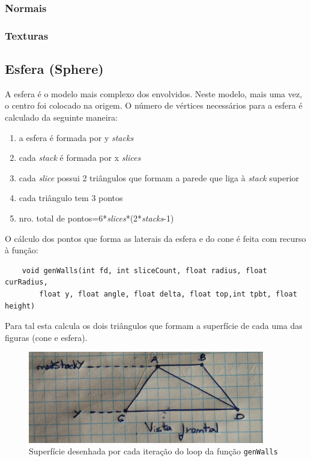 \documentclass{article}
\begin{document}
\subsubsection{Normais}

\subsubsection{Texturas}

\subsection{Esfera (Sphere)}
A esfera é o modelo mais complexo dos envolvidos. Neste modelo, mais uma vez, o centro foi colocado na origem. O número de vértices necessários para a esfera é calculado da seguinte maneira:
\begin{enumerate}
    \item a esfera é formada por y \textit{stacks}
    \item cada \textit{stack} é formada por x \textit{slices}
    \item cada \textit{slice} possui 2 triângulos que formam a parede que liga à \textit{stack} superior
    \item cada triângulo tem 3 pontos
    \item nro. total de pontos=6*\textit{slices}*(2*\textit{stacks}-1)
\end{enumerate}

O cálculo dos pontos que forma as laterais da esfera e do cone é feita com recurso à função:
\begin{Verbatim}
    void genWalls(int fd, int sliceCount, float radius, float curRadius, 
        float y, float angle, float delta, float top,int tpbt, float height)
\end{Verbatim}

Para tal esta calcula os dois triângulos que formam a superfície de cada uma das figuras (cone e esfera).
\begin{figure}[H]
    \centering
    \includegraphics[height=4cm]{genWallsDemo.jpg}
    \caption{Superfície desenhada por cada iteração do loop da função \texttt{genWalls}}
\end{figure}
\end{document}
